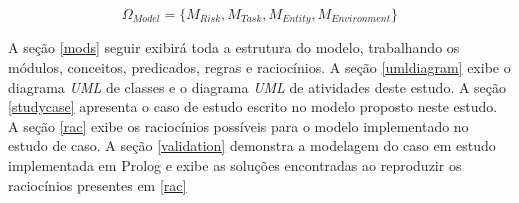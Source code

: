 \begin{equation} 
    \Omega_{Model} = \{ M_{Risk}, M_{Task}, M_{Entity}, M_{Environment}\}
\end{equation}
\label{modules}

A seção \ref{mods} seguir exibirá toda a estrutura do modelo, trabalhando os módulos, conceitos, predicados, regras e raciocínios. A seção \ref{umldiagram} exibe o diagrama \textit{UML} de classes e o diagrama \textit{UML} de atividades deste estudo. A seção \ref{studycase} apresenta o caso de estudo escrito no modelo proposto neste estudo. A seção \ref{rac} exibe os raciocínios possíveis para o modelo implementado no estudo de caso. A seção \ref{validation} demonstra a modelagem do caso em estudo implementada em Prolog e exibe as soluções encontradas ao reproduzir os raciocínios presentes em \ref{rac}  